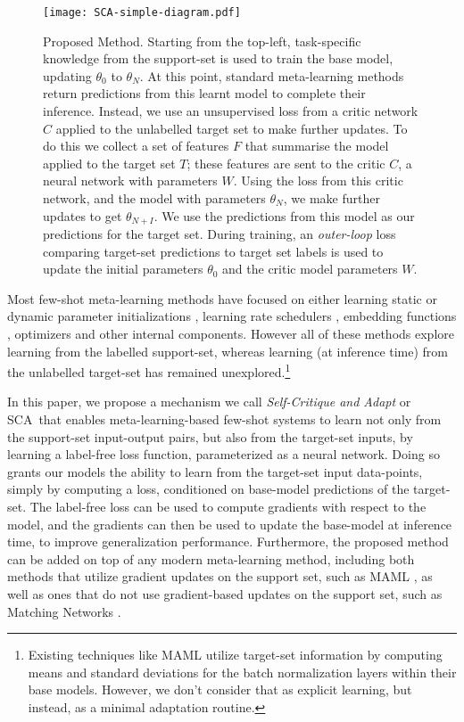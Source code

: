 \documentclass{article} \usepackage[dvipsnames]{xcolor}
\newcommand{\proposedmethod}{SCA}
\begin{document}
\begin{figure}[!htbp]
    \centering
    \texttt{[image: SCA-simple-diagram.pdf]}
    \vspace{-5.0mm}
    \caption{Proposed Method. Starting from the top-left, task-specific knowledge from the support-set is used to train the base model, updating $\theta_0$ to $\theta_N$. At this point, standard meta-learning methods return predictions from this learnt model to complete their inference. Instead, we use an unsupervised loss from a critic network $C$ applied to the unlabelled target set to make further updates. To do this we collect a set of features $F$ that summarise the model applied to the target set $T$; these features are sent to the critic $C$, a neural network with parameters $W$. Using the loss from this critic network, and the model with parameters $\theta_N$, we make further updates to get $\theta_{N+I}$. We use the predictions from this model as our predictions for the target set. During training, an \emph{outer-loop} loss comparing target-set predictions to target set labels is used to update the initial parameters $\theta_0$ and the critic model parameters $W$.}
    \label{fig:sca-diagram}
    \vspace{-5.0mm}
\end{figure}




Most few-shot meta-learning methods have focused on either learning static \citep{finn2017model,antoniou2018train,li2016learning} or dynamic parameter initializations \citep{rusu2018meta}, learning rate schedulers \citep{antoniou2018train}, embedding functions \cite{vinyals2016matching, snell2017prototypical}, optimizers \cite{ravi2016optimization} and other internal components. However all of these methods explore learning from the labelled support-set, whereas learning (at inference time) from the unlabelled target-set has remained unexplored.\footnote{Existing techniques like MAML \cite{finn2017model} utilize target-set information by computing means and standard deviations for the batch normalization layers within their base models. However, we don't consider that as explicit learning, but instead, as a minimal adaptation routine.}

In this paper, we propose a mechanism we call \emph{Self-Critique and Adapt} or \proposedmethod\ that enables meta-learning-based few-shot systems to learn not only from the support-set input-output pairs, but also from the target-set inputs, by learning a label-free loss function, parameterized as a neural network. Doing so grants our models the ability to learn from the target-set input data-points, simply by computing a loss, conditioned on base-model predictions of the target-set. The label-free loss can be used to compute gradients with respect to the model, and the gradients can then be used to update the base-model at inference time, to improve generalization performance. Furthermore, the proposed method can be added on top of any modern meta-learning method, including both methods that utilize gradient updates on the support set, such as MAML \citep{finn2017model}, as well as ones that do not use gradient-based updates on the support set, such as Matching Networks \citep{vinyals2016matching}.
\end{document}
